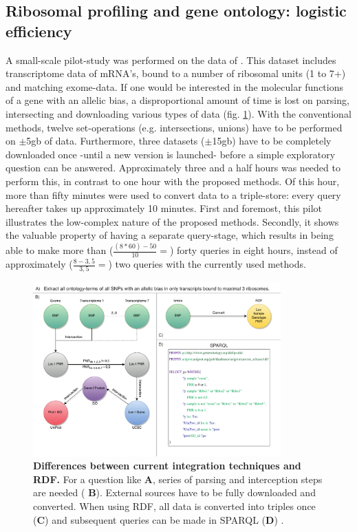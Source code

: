 \documentclass[twoside,fontsize=12pt]{article}
\begin{document}
\subsection*{Ribosomal profiling and gene ontology: logistic efficiency}
A small-scale pilot-study was performed on the data of \citet{VanHeesch2014}. This dataset includes transcriptome data of mRNA's, bound to a number of ribosomal units (1 to 7+) and matching exome-data. If one would be interested in the molecular functions of a gene with an allelic bias, a disproportional amount of time is lost on parsing, intersecting and downloading various types of data (fig. \ref{fig:awesome_image}). With the conventional methods, twelve set-operations (e.g. intersections, unions) have to be performed on $\pm$5gb of data. Furthermore, three datasets ($\pm$15gb) have to be completely downloaded once -until a new version is launched- before a simple exploratory question can be answered. Approximately three and a half hours was needed to perform this, in contrast to one hour with the proposed methods. Of this hour, more than fifty minutes were used to convert data to a triple-store: every query hereafter takes up approximately 10 minutes. First and foremost, this pilot illustrates the low-complex nature of the proposed methods. Secondly, it shows the valuable property of having a separate query-stage, which results in being able to make more than ($\frac{(8*60)-50}{10}= $) forty queries in eight hours, instead of approximately ($\frac{8-3,5}{3,5}= $) two queries with the currently used methods.
\begin{figure}[h!]
    \centering
    \includegraphics[width=0.85\textwidth]{DifferencesInDoingThings}
    \caption{\textbf{Differences between current integration techniques and RDF.} For a question like \textbf{A}, series of parsing and interception steps are needed ( \textbf{B}). External sources have to be fully downloaded and converted. When using RDF, all data is converted into triples once (\textbf{C}) and subsequent queries can be made in SPARQL (\textbf{D})%
    .}
    \label{fig:awesome_image}
\end{figure}
\end{document}
